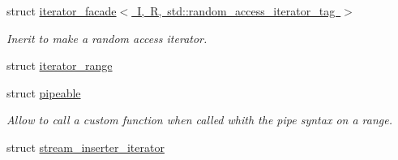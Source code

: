 \begin{DoxyCompactItemize}
struct \mbox{\hyperlink{structrah_1_1iterator__facade_3_01_i_00_01_r_00_01std_1_1random__access__iterator__tag_01_4}{iterator\+\_\+facade$<$ I, R, std\+::random\+\_\+access\+\_\+iterator\+\_\+tag $>$}}
\begin{DoxyCompactList}\small\item\em Inerit to make a random access iterator. \end{DoxyCompactList}\item 
struct \mbox{\hyperlink{structrah_1_1iterator__range}{iterator\+\_\+range}}
\item 
struct \mbox{\hyperlink{structrah_1_1pipeable}{pipeable}}
\begin{DoxyCompactList}\small\item\em Allow to call a custom function when called whith the \textquotesingle{}pipe\textquotesingle{} syntax on a range. \end{DoxyCompactList}\item 
struct \mbox{\hyperlink{structrah_1_1stream__inserter__iterator}{stream\+\_\+inserter\+\_\+iterator}}
\end{DoxyCompactItemize}
